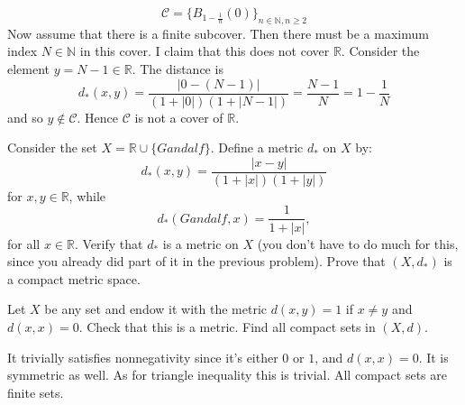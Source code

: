 \begin{solution}
    \begin{equation}
      \mathscr{C} = \{B_{1 - \frac{1}{n}} (0)\}_{n \in \mathbb{N}, n \geq 2}
    \end{equation}
    Now assume that there is a finite subcover. Then there must be a maximum index $N \in \mathbb{N}$ in this cover. I claim that this does not cover $\mathbb{R}$. Consider the element $y = N - 1 \in \mathbb{R}$. The distance is 
    \begin{equation}
      d_\ast (x, y) = \frac{|0 - (N - 1)|}{(1 + |0|)(1 + |N-1|)} = \frac{N-1}{N} = 1 - \frac{1}{N}
    \end{equation} 
    and so $y \not\in \mathscr{C}$. Hence $\mathscr{C}$ is not a cover of $\mathbb{R}$. 
  \end{solution}

  \begin{exercise}
    Consider the set $X = \mathbb{R} \cup \{Gandalf\}$. Define a metric $d_{\ast}$ on $X$ by:
    \begin{equation}
      d_{\ast}(x,y) = \frac{|x-y|}{(1+|x|)(1+|y|)}
    \end{equation}
    for $x,y \in \mathbb{R}$, while
    \begin{equation}
      d_{\ast}(Gandalf,x) = \frac{1}{1+|x|},
    \end{equation}
    for all $x \in \mathbb{R}$. Verify that $d_{\ast}$ is a metric on $X$ (you don't have to do much
    for this, since you already did part of it in the previous problem). Prove
    that $(X,d_{\ast})$ is a compact metric space.
  \end{exercise}
  \begin{solution}
    
  \end{solution}

  \begin{exercise}
    Let $X$ be any set and endow it with the metric $d(x,y) = 1$ if $x \neq y$ and
    $d(x,x) = 0$. Check that this is a metric. Find all compact sets in $(X,d)$.
  \end{exercise}
  \begin{solution}
    It trivially satisfies nonnegativity since it's either $0$ or $1$, and $d(x, x) = 0$. It is symmetric as well. As for triangle inequality this is trivial. All compact sets are finite sets. 
  \end{solution}

